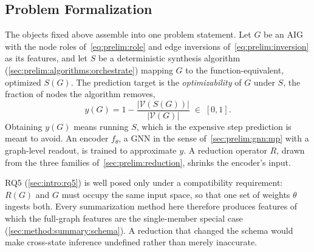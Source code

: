 \subsection{Problem Formalization}


\label{sec:prelim:formalization}
The objects fixed above assemble into one problem statement. Let $G$ be an AIG with the
node roles of~\eqref{eq:prelim:role} and edge inversions of~\eqref{eq:prelim:inversion} as
its features, and let $S$ be a deterministic synthesis algorithm
(\ref{sec:prelim:algorithms:orchestrate}) mapping $G$ to the function-equivalent,
optimized $S(G)$. The prediction target is the \emph{optimizability} of $G$ under $S$,
the fraction of nodes the algorithm removes,
\begin{equation}
    y(G) = 1 - \frac{\left| \mathcal{V}(S(G)) \right|}{\left| \mathcal{V}(G) \right|}
    \;\in\; [0, 1].
    \label{eq:prelim:target}
\end{equation}
Obtaining $y(G)$ means running $S$, which is the expensive step prediction is meant to
avoid. An encoder $f_\theta$, a GNN in the sense of~\ref{sec:prelim:gnn:mp} with a
graph-level readout, is trained to approximate $y$. A reduction operator $R$, drawn from
the three families of~\ref{sec:prelim:reduction}, shrinks the encoder's input.

RQ5 (\ref{sec:intro:rq5}) is well posed only under a compatibility requirement: $R(G)$ and
$G$ must occupy the same input space, so that one set of weights $\theta$ ingests both.
Every summarization method here therefore produces features of which the full-graph
features are the single-member special case (\ref{sec:method:summary:schema}). A
reduction that changed the schema would make cross-state inference undefined rather than
merely inaccurate.

